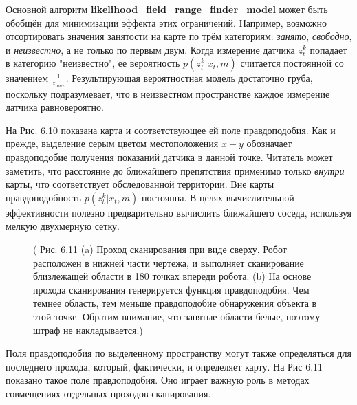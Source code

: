 \documentclass[10pt,a4paper]{article}
\begin{document}
Основной алгоритм \textbf{likelihood\_field\_range\_finder\_model} может быть обобщён для минимизации эффекта этих ограничений. Например, возможно отсортировать значения занятости на карте по трём категориям: \textit{занято}, \textit{свободно}, и \textit{неизвестно}, а не только по первым двум. Когда измерение датчика $z_t^k$ попадает в категорию "неизвестно", ее вероятность $p(z_t^k | x_t, m)$ считается постоянной со значением $\frac{1}{z_{max}}$. Результирующая вероятностная модель достаточно груба, поскольку подразумевает, что в неизвестном пространстве каждое измерение датчика равновероятно.

На Рис. 6.10 показана карта и соответствующее ей поле правдоподобия. Как и прежде, выделение серым цветом местоположения $x-y$ обозначает правдоподобие получения показаний датчика в данной точке. Читатель может заметить, что расстояние до ближайшего препятствия применимо только \textit{внутри} карты, что соответствует обследованной территории. Вне карты правдоподобность $p(z_t^k | x_t, m)$ постоянна. В целях вычислительной эффективности полезно предварительно вычислить ближайшего соседа, используя мелкую двухмерную сетку.

\begin{figure}[H]
	\caption{ (  Рис. 6.11 (a) Проход сканирования при виде сверху. Робот расположен в нижней части чертежа, и выполняет сканирование близлежащей области в 180 точках впереди робота. (b) На основе прохода сканирования генерируется функция правдоподобия. Чем темнее область, тем меньше правдоподобие обнаружения объекта в этой точке. Обратим внимание, что занятые области белые, поэтому штраф не накладывается.)}
	\label{fig:611orig}
\end{figure}

Поля правдоподобия по выделенному пространству могут также определяться для последнего прохода, который, фактически, и определяет карту. На Рис 6.11 показано такое поле правдоподобия. Оно играет важную роль в методах совмещениях отдельных проходов сканирования. \\
\end{document}
